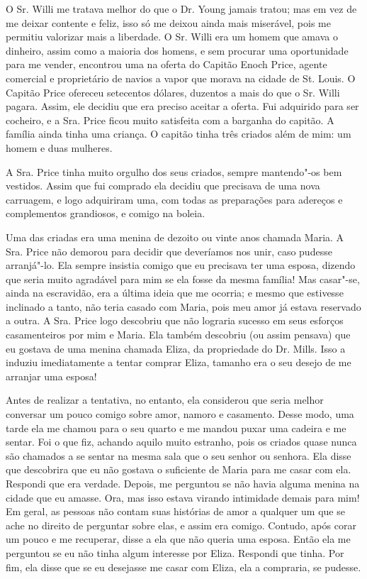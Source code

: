 O Sr. Willi me tratava melhor do que o Dr. Young jamais tratou; mas em
vez de me deixar contente e feliz, isso só me deixou ainda mais
miserável, pois me permitiu valorizar mais a liberdade. O Sr. Willi era
um homem que amava o dinheiro, assim como a maioria dos homens, e sem
procurar uma oportunidade para me vender, encontrou uma na oferta do
Capitão Enoch Price, agente comercial e proprietário de navios a vapor
que morava na cidade de St. Louis. O Capitão Price ofereceu setecentos
dólares, duzentos a mais do que o Sr. Willi pagara. Assim, ele decidiu
que era preciso aceitar a oferta. Fui adquirido para ser cocheiro, e a
Sra. Price ficou muito satisfeita com a barganha do capitão. A família
ainda tinha uma criança. O capitão tinha três criados além de mim: um
homem e duas mulheres.

A Sra. Price tinha muito orgulho dos seus criados, sempre mantendo"-os
bem vestidos. Assim que fui comprado ela decidiu que precisava de uma
nova carruagem, e logo adquiriram uma, com todas as preparações para
adereços e complementos grandiosos, e comigo na boleia.

Uma das criadas era uma menina de dezoito ou vinte anos chamada Maria. A
Sra. Price não demorou para decidir que deveríamos nos unir, caso
pudesse arranjá"-lo. Ela sempre insistia comigo que eu precisava ter uma
esposa, dizendo que seria muito agradável para mim se ela fosse da mesma
família! Mas casar"-se, ainda na escravidão, era a última ideia que me
ocorria; e mesmo que estivesse inclinado a tanto, não teria casado com
Maria, pois meu amor já estava reservado a outra. A Sra. Price logo
descobriu que não lograria sucesso em seus esforços casamenteiros por
mim e Maria. Ela também descobriu (ou assim pensava) que eu gostava de
uma menina chamada Eliza, da propriedade do Dr. Mills. Isso a induziu
imediatamente a tentar comprar Eliza, tamanho era o seu desejo de me
arranjar uma esposa!

Antes de realizar a tentativa, no entanto, ela considerou que seria
melhor conversar um pouco comigo sobre amor, namoro e casamento. Desse
modo, uma tarde ela me chamou para o seu quarto e me mandou puxar uma
cadeira e me sentar. Foi o que fiz, achando aquilo muito estranho, pois
os criados quase nunca são chamados a se sentar na mesma sala que o seu
senhor ou senhora. Ela disse que descobrira que eu não gostava o
suficiente de Maria para me casar com ela. Respondi que era verdade.
Depois, me perguntou se não havia alguma menina na cidade que eu amasse.
Ora, mas isso estava virando intimidade demais para mim! Em geral, as
pessoas não contam suas histórias de amor a qualquer um que se ache no
direito de perguntar sobre elas, e assim era comigo. Contudo, após corar
um pouco e me recuperar, disse a ela que não queria uma esposa. Então
ela me perguntou se eu não tinha algum interesse por Eliza. Respondi que
tinha. Por fim, ela disse que se eu desejasse me casar com Eliza, ela a
compraria, se pudesse.


